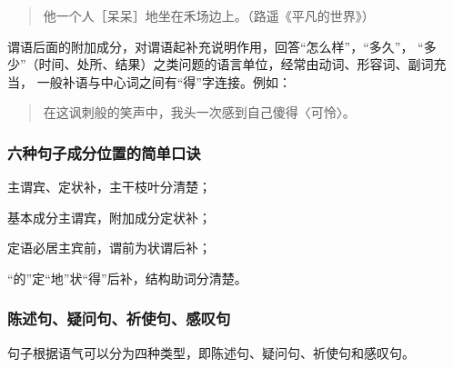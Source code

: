 \documentclass[final,oneside]{ctexbook}
\newenvironment{equotation}{\begin{quotation}\kaishu}{\end{quotation}}
\begin{document}
\begin{description}
\begin{equotation}
      他一个人［呆呆］地坐在禾场边上。（路遥《平凡的世界》）
    \end{equotation}

  \item[补语] 谓语后面的附加成分，对谓语起补充说明作用，回答“怎么样”，“多久”，
    “多少”（时间、处所、结果）之类问题的语言单位，经常由动词、形容词、副词充当，
    一般补语与中心词之间有“得”字连接。例如：
    \begin{equotation}
      在这讽刺般的笑声中，我头一次感到自己傻得〈可怜〉。
    \end{equotation}

\end{description}

\subsubsection{六种句子成分位置的简单口诀}

\begin{center}
  主谓宾、定状补，主干枝叶分清楚；

  基本成分主谓宾，附加成分定状补；

  定语必居主宾前，谓前为状谓后补；

  “的”定“地”状“得”后补，结构助词分清楚。
\end{center}

\subsubsection{陈述句、疑问句、祈使句、感叹句}

句子根据语气可以分为四种类型，即陈述句、疑问句、祈使句和感叹句。
\end{document}
